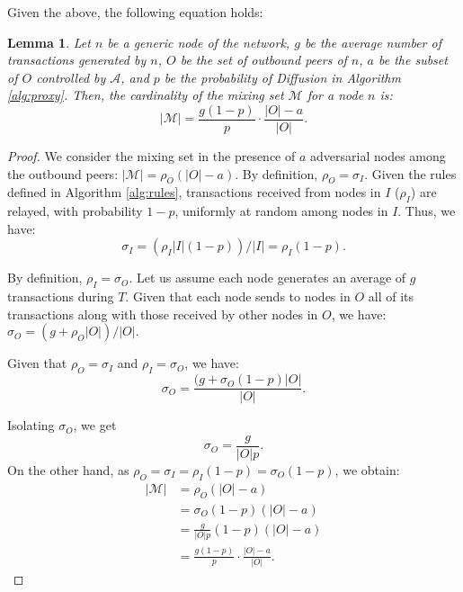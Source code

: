 \documentclass{article}
\newtheorem{lemm}{Lemma}
\begin{document}
	Given the above, the following equation holds:
	\begin{lemm}
		\label{lem:mixing}
		Let $n$ be a generic node of the network, $g$ be the average number of transactions generated by $n$, $O$ be the set of outbound peers of $n$, $a$ be the subset of $O$ controlled by $\mathcal{A}$, and $p$ be the probability of Diffusion in Algorithm \ref{alg:proxy}.
		Then, the cardinality of the mixing set $\mathcal{M}$ for a node $n$ is:
		\begin{equation}
			|\mathcal{M}| = \frac{g(1-p)}{p}{\cdot}\frac{|O|-a}{|O|}.
		\end{equation}
	\end{lemm}
	\begin{proof}
		We consider the mixing set in the presence of $a$ adversarial nodes among the outbound peers: $|\mathcal{M}| = \rho_O(|O|-a)$.
		By definition, $\rho_O = \sigma_I$.
		Given the rules defined in Algorithm \ref{alg:rules},
		transactions received from nodes in $I$ ($\rho_I$) are relayed, with probability $1-p$, uniformly at random among nodes in $I$.
		Thus, we have: 
		\begin{equation}
			\sigma_I=(\rho_I|I|(1-p))/|I|=\rho_I(1-p).
		\end{equation}
		
		By definition, $\rho_I=\sigma_O$.
		Let us assume each node generates an average of $g$ transactions during $T$.
		Given that each node sends to nodes in $O$ all of its transactions along with those received by other nodes in $O$, we have:
		$\sigma_O = (g + \rho_O|O|)/|O|.$
		
		Given that $\rho_O=\sigma_I$ and $\rho_I=\sigma_O$, we have:
		\begin{equation}
			\sigma_O = \frac{(g + \sigma_O(1-p)|O|}{|O|} .
		\end{equation}
		
		Isolating $\sigma_O$, we get
		\begin{equation}
			\sigma_O = \frac{g}{|O|p} .
		\end{equation}	
		On the other hand, as $\rho_O=\sigma_I=\rho_I(1-p)=\sigma_O(1-p)$,
		we obtain:
		\begin{equation}	
			\begin{split}
				|\mathcal{M}| &= \rho_O(|O|-a)\\
				&= \sigma_O(1-p)(|O|-a)\\
				&= \frac{g}{|O|p}(1-p)(|O|-a)\\
				&= \frac{g(1-p)}{p}{\cdot}\frac{|O|-a}{|O|}.
			\end{split}
		\end{equation}
	\end{proof}
	
\end{document}
